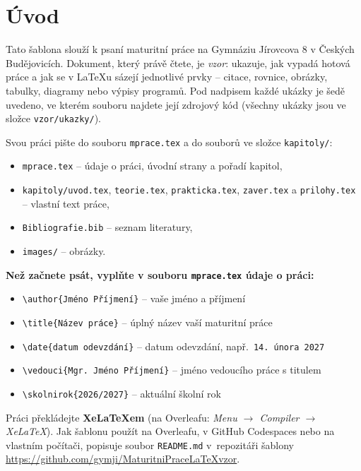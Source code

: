 \chapter*{Úvod}

Tato šablona slouží k psaní maturitní práce na Gymnáziu Jírovcova 8 v Českých Budějovicích.
Dokument, který právě čtete, je \emph{vzor}: ukazuje, jak vypadá hotová práce
a jak se v \LaTeX{}u sázejí jednotlivé prvky -- citace, rovnice, obrázky, tabulky,
diagramy nebo výpisy programů.
Pod nadpisem každé ukázky je šedě uvedeno, ve kterém souboru najdete její zdrojový kód
(všechny ukázky jsou ve složce \texttt{vzor/ukazky/}).

Svou práci pište do souboru \texttt{mprace.tex} a do souborů ve složce \texttt{kapitoly/}:
\begin{itemize}
	\item \texttt{mprace.tex} -- údaje o práci, úvodní strany a pořadí kapitol,
	\item \texttt{kapitoly/uvod.tex}, \texttt{teorie.tex}, \texttt{prakticka.tex}, \texttt{zaver.tex}
	      a \texttt{prilohy.tex} -- vlastní text práce,
	\item \texttt{Bibliografie.bib} -- seznam literatury,
	\item \texttt{images/} -- obrázky.
\end{itemize}

\textbf{Než začnete psát, vyplňte v souboru \texttt{mprace.tex} údaje o práci:}
\begin{itemize}
	\item \verb|\author{Jméno Příjmení}| \quad -- vaše jméno a příjmení
	\item \verb|\title{Název práce}| \quad -- úplný název vaší maturitní práce
	\item \verb|\date{datum odevzdání}| \quad -- datum odevzdání, např.~\texttt{14.~února~2027}
	\item \verb|\vedouci{Mgr. Jméno Příjmení}| \quad -- jméno vedoucího práce s titulem
	\item \verb|\skolnirok{2026/2027}| \quad -- aktuální školní rok
\end{itemize}

Práci překládejte \textbf{XeLaTeXem} (na Overleafu: \emph{Menu $\to$ Compiler $\to$ XeLaTeX}).
Jak šablonu použít na Overleafu, v GitHub Codespaces nebo na vlastním počítači,
popisuje soubor \texttt{README.md} v~repozitáři šablony
\url{https://github.com/gymji/MaturitniPraceLaTeXvzor}.
